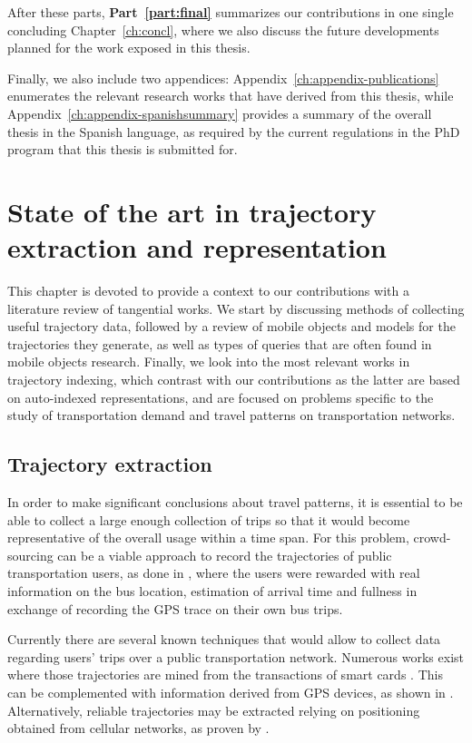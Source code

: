 \documentclass[a4paper,10pt,twoside]{book}
\begin{document}
	After these parts, \textbf{Part~\ref{part:final}} summarizes our contributions in one single concluding Chapter~\ref{ch:concl}, where we also discuss the future developments planned for the work exposed in this thesis.
	
	Finally, we also include two appendices: Appendix~\ref{ch:appendix-publications} enumerates the relevant research works that have derived from this thesis, while Appendix~\ref{ch:appendix-spanishsummary} provides a summary of the overall thesis in the Spanish language, as required by the current regulations in the PhD program that this thesis is submitted for.
	
\chapter{State of the art in trajectory extraction and representation}
\label{ch:state}
    This chapter is devoted to provide a context to our contributions with a literature review of tangential works. We start by discussing methods of collecting useful trajectory data, followed by a review of mobile objects and models for the trajectories they generate, as well as types of queries that are often found in mobile objects research. Finally, we look into the most relevant works in trajectory indexing, which contrast with our contributions as the latter are based on auto-indexed representations, and are focused on problems specific to the study of transportation demand and travel patterns on transportation networks.

	\section{Trajectory extraction}
	\label{sec:dm}
	In order to make significant conclusions about travel patterns, it is essential to be able to collect a large enough collection of trips so that it would become representative of the overall usage within a time span. For this problem, crowd-sourcing can be a viable approach to record the trajectories of public transportation users, as done in \cite{zimmerman2011field}, where the users were rewarded with real information on the bus location, estimation of arrival time and fullness in exchange of recording the GPS trace on their own bus trips.
	
	Currently there are several known techniques that would allow to collect data regarding users' trips over a public transportation network. Numerous works exist where those trajectories are mined from the transactions of smart cards \cite{bhaskar2015passenger,wang2014aggregated}. This can be complemented with information derived from GPS devices, as shown in \cite{ma2014development}. Alternatively, reliable trajectories may be extracted relying on positioning obtained from cellular networks, as proven by \cite{liu2017exploring}.
\end{document}
